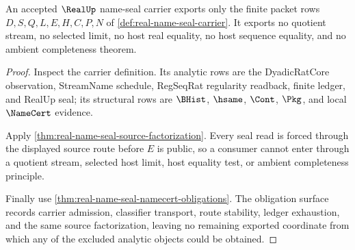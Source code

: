 \begin{theorem}
\label{thm:real-name-seal-no-completeness}
An accepted $\RealUp$ name-seal carrier exports only the finite packet rows $D,S,Q,L,E,H,C,P,N$ of \autoref{def:real-name-seal-carrier}. It exports no quotient stream, no selected limit, no host real equality, no host sequence equality, and no ambient completeness theorem.
\end{theorem}
\begin{proof}
Inspect the carrier definition. Its analytic rows are the DyadicRatCore observation, StreamName schedule, RegSeqRat regularity readback, finite ledger, and RealUp seal; its structural rows are $\BHist$, $\hsame$, $\Cont$, $\Pkg$, and local $\NameCert$ evidence.

Apply \autoref{thm:real-name-seal-source-factorization}. Every seal read is forced through the displayed source route before $E$ is public, so a consumer cannot enter through a quotient stream, selected host limit, host equality test, or ambient completeness principle.

Finally use \autoref{thm:real-name-seal-namecert-obligations}. The obligation surface records carrier admission, classifier transport, route stability, ledger exhaustion, and the same source factorization, leaving no remaining exported coordinate from which any of the excluded analytic objects could be obtained.
\end{proof}

